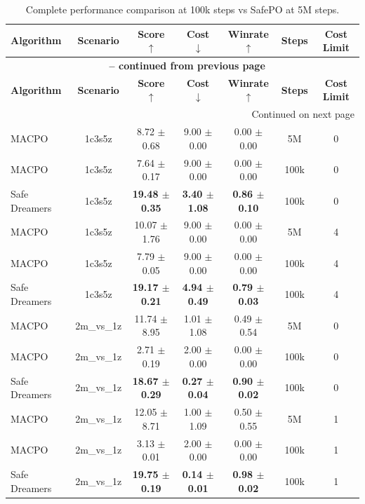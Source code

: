 \begin{longtable}{lcccccc}
\caption{Complete performance comparison at 100k steps vs SafePO at 5M steps.}
\label{tab:complete_performance_comparison_100k} \\
\toprule
\textbf{Algorithm} & \textbf{Scenario} & \textbf{Score} $\uparrow$ & \textbf{Cost} $\downarrow$ & \textbf{Winrate} $\uparrow$ & \textbf{Steps} & \textbf{Cost Limit} \\
\midrule
\endfirsthead
\multicolumn{7}{c}{{\bfseries \tablename\ \thetable{} -- continued from previous page}} \\
\toprule
\textbf{Algorithm} & \textbf{Scenario} & \textbf{Score} $\uparrow$ & \textbf{Cost} $\downarrow$ & \textbf{Winrate} $\uparrow$ & \textbf{Steps} & \textbf{Cost Limit} \\
\midrule
\endhead
\midrule \multicolumn{7}{r}{{Continued on next page}} \\
\endfoot
\bottomrule
\endlastfoot
MACPO & 1c3s5z & 8.72 $\pm$ 0.68 & 9.00 $\pm$ 0.00 & 0.00 $\pm$ 0.00 & 5M & 0 \\
MACPO & 1c3s5z & 7.64 $\pm$ 0.17 & 9.00 $\pm$ 0.00 & 0.00 $\pm$ 0.00 & 100k & 0 \\
Safe Dreamers & 1c3s5z & \textbf{19.48 $\pm$ 0.35} & \textbf{3.40 $\pm$ 1.08} & \textbf{0.86 $\pm$ 0.10} & 100k & 0 \\
\midrule
MACPO & 1c3s5z & 10.07 $\pm$ 1.76 & 9.00 $\pm$ 0.00 & 0.00 $\pm$ 0.00 & 5M & 4 \\
MACPO & 1c3s5z & 7.79 $\pm$ 0.05 & 9.00 $\pm$ 0.00 & 0.00 $\pm$ 0.00 & 100k & 4 \\
Safe Dreamers & 1c3s5z & \textbf{19.17 $\pm$ 0.21} & \textbf{4.94 $\pm$ 0.49} & \textbf{0.79 $\pm$ 0.03} & 100k & 4 \\
\midrule
MACPO & 2m\_vs\_1z & 11.74 $\pm$ 8.95 & 1.01 $\pm$ 1.08 & 0.49 $\pm$ 0.54 & 5M & 0 \\
MACPO & 2m\_vs\_1z & 2.71 $\pm$ 0.19 & 2.00 $\pm$ 0.00 & 0.00 $\pm$ 0.00 & 100k & 0 \\
Safe Dreamers & 2m\_vs\_1z & \textbf{18.67 $\pm$ 0.29} & \textbf{0.27 $\pm$ 0.04} & \textbf{0.90 $\pm$ 0.02} & 100k & 0 \\
\midrule
MACPO & 2m\_vs\_1z & 12.05 $\pm$ 8.71 & 1.00 $\pm$ 1.09 & 0.50 $\pm$ 0.55 & 5M & 1 \\
MACPO & 2m\_vs\_1z & 3.13 $\pm$ 0.01 & 2.00 $\pm$ 0.00 & 0.00 $\pm$ 0.00 & 100k & 1 \\
Safe Dreamers & 2m\_vs\_1z & \textbf{19.75 $\pm$ 0.19} & \textbf{0.14 $\pm$ 0.01} & \textbf{0.98 $\pm$ 0.02} & 100k & 1 \\

\end{longtable}
